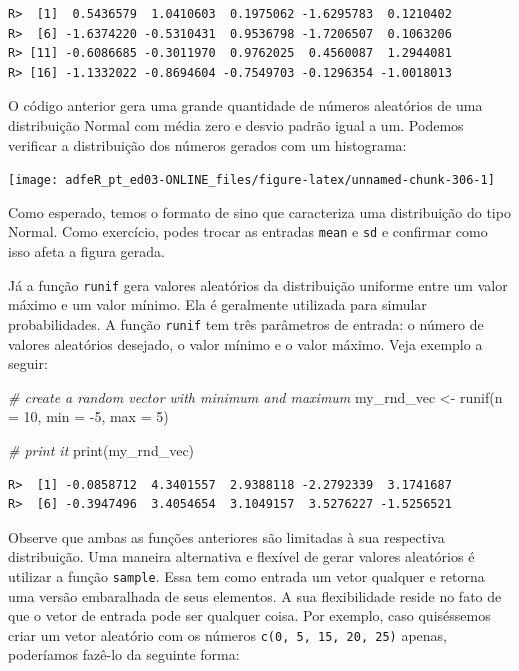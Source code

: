 \documentclass[
  11pt,
]{book}
\newenvironment{Shaded}{\begin{snugshade}}{\end{snugshade}}
\newcommand{\AttributeTok}[1]{\textcolor[rgb]{0.61,0.61,0.61}{#1}}
\newcommand{\CommentTok}[1]{\textcolor[rgb]{0.37,0.37,0.37}{\textit{#1}}}
\newcommand{\DecValTok}[1]{\textcolor[rgb]{0.06,0.06,0.06}{#1}}
\newcommand{\FunctionTok}[1]{\textcolor[rgb]{0,0,0}{#1}}
\newcommand{\NormalTok}[1]{#1}
\newcommand{\OtherTok}[1]{\textcolor[rgb]{0.37,0.37,0.37}{#1}}
\newcommand{\SpecialCharTok}[1]{\textcolor[rgb]{0,0,0}{#1}}
\begin{document}
\begin{verbatim}
R>  [1]  0.5436579  1.0410603  0.1975062 -1.6295783  0.1210402
R>  [6] -1.6374220 -0.5310431  0.9536798 -1.7206507  0.1063206
R> [11] -0.6086685 -0.3011970  0.9762025  0.4560087  1.2944081
R> [16] -1.1332022 -0.8694604 -0.7549703 -0.1296354 -1.0018013
\end{verbatim}

O código anterior gera uma grande quantidade de números aleatórios de uma distribuição Normal com média zero e desvio padrão igual a um. Podemos verificar a distribuição dos números gerados com um histograma:

\begin{center}\texttt{[image: adfeR\_pt\_ed03-ONLINE\_files/figure-latex/unnamed-chunk-306-1]} \end{center}

Como esperado, temos o formato de sino que caracteriza uma distribuição do tipo Normal. Como exercício, podes trocar as entradas \texttt{mean} e \texttt{sd} e confirmar como isso afeta a figura gerada.

Já a função \texttt{runif} gera valores aleatórios da distribuição uniforme entre um valor máximo e um valor mínimo. Ela é geralmente utilizada para simular probabilidades. A função \texttt{runif} tem três parâmetros de entrada: o número de valores aleatórios desejado, o valor mínimo e o valor máximo. Veja exemplo a seguir:

\begin{Shaded}
\begin{Highlighting}[]
\CommentTok{\# create a random vector with minimum and maximum}
\NormalTok{my\_rnd\_vec }\OtherTok{\textless{}{-}} \FunctionTok{runif}\NormalTok{(}\AttributeTok{n =} \DecValTok{10}\NormalTok{,}
                    \AttributeTok{min =} \SpecialCharTok{{-}}\DecValTok{5}\NormalTok{,}
                    \AttributeTok{max =} \DecValTok{5}\NormalTok{)}

\CommentTok{\# print it}
\FunctionTok{print}\NormalTok{(my\_rnd\_vec)}
\end{Highlighting}
\end{Shaded}

\begin{verbatim}
R>  [1] -0.0858712  4.3401557  2.9388118 -2.2792339  3.1741687
R>  [6] -0.3947496  3.4054654  3.1049157  3.5276227 -1.5256521
\end{verbatim}

Observe que ambas as funções anteriores são limitadas à sua respectiva distribuição. Uma maneira alternativa e flexível de gerar valores aleatórios é utilizar a função \texttt{sample}. Essa tem como entrada um vetor qualquer e retorna uma versão embaralhada de seus elementos. A sua flexibilidade reside no fato de que o vetor de entrada pode ser qualquer coisa. Por exemplo, caso quiséssemos criar um vetor aleatório com os números \texttt{c(0,\ 5,\ 15,\ 20,\ 25)} apenas, poderíamos fazê-lo da seguinte forma: 
\end{document}
